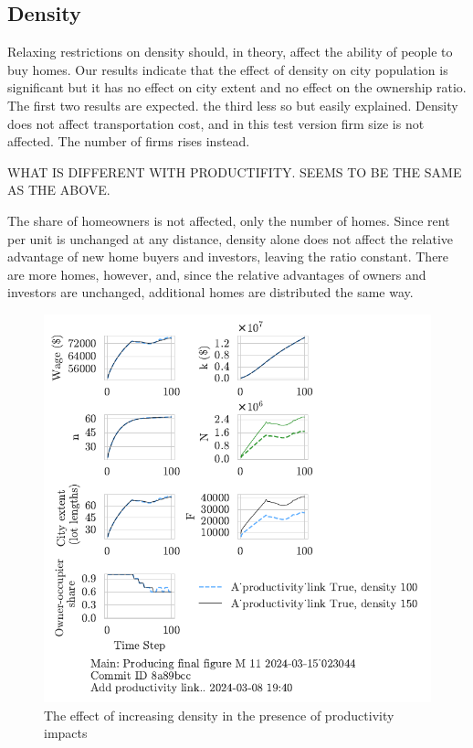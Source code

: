 \newpage
\subsection{Density}
Relaxing restrictions on density should, in theory, affect the ability of people to buy homes. Our results indicate that the effect of density on city population is significant but it has no effect on city extent and no effect on the ownership ratio. The first two results are expected. the third less so but easily explained. Density does not affect transportation cost, and in this test version firm size is not affected. The number of firms rises instead. 

WHAT IS DIFFERENT WITH PRODUCTIFITY. SEEMS TO BE THE SAME AS THE ABOVE.

The share of homeowners is not affected, only the number of homes. Since rent per unit is unchanged at any distance, density alone does not affect the relative advantage of new home buyers and investors, leaving the ratio constant. There are more homes, however, and, since the relative advantages of owners and investors are unchanged, additional homes are distributed the same way.  


\begin{figure}[h!bt]
    \centering
    \includegraphics[scale=1, trim={0 1.4cm 0 0},clip]{fig/With-productivity_link-density-023044.pdf}
    \caption{The effect of increasing density in the presence of productivity impacts}
    \label{fig:Productivity_link_and_density_ownership_trajectory}
\end{figure}


